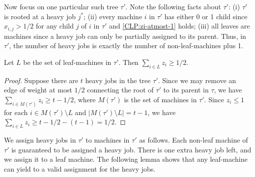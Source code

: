 \documentclass[11pt]{article}
\begin{document}
Now focus on one particular such tree $\tau'$. Note the following facts about $\tau'$: (i) $\tau'$ is rooted at a heavy job $j^*$; (ii) every machine $i$ in $\tau'$ has either 0 or 1 child since $x_{i,j} > 1/2$ for any child $j$ of $i$ in $\tau'$ and \eqref{CLP:zi-atmost-1} holds; (iii) all leaves are machines since a heavy job can only be partially assigned to its parent.  Thus, in $\tau'$, the number of heavy jobs is exactly the number of non-leaf-machines plus 1. 
\begin{lemma}
\label{lem:sum-z-is-large}
Let $L$ be the set of leaf-machines in $\tau'$. Then $\sum_{i \in L}z_i \geq 1/2$.
\end{lemma}
\begin{proof}
Suppose there are $t$ heavy jobs in the tree $\tau'$. Since we may remove an edge of weight at most $1/2$ connecting the root of $\tau'$ to its parent in $\tau$, we have $\sum_{i \in M(\tau')}z_i \geq t-1/2$, where $M(\tau')$ is the set of machines in $\tau'$.  Since $z_i \leq 1$ for each $i \in M(\tau') \setminus L$ and $|M(\tau') \setminus L| = t-1$, we have $\sum_{i \in L}z_i \geq t-1/2 - (t-1) = 1/2$.
\end{proof}

We assign heavy jobs in $\tau'$ to machines in $\tau'$ as follows. Each non-leaf machine of $\tau'$ is guaranteed to be assigned a heavy job.  There is one extra heavy job left, and we assign it to a leaf machine.  The following lemma shows that any leaf-machine can yield to a valid assignment for the heavy jobs.
\end{document}
